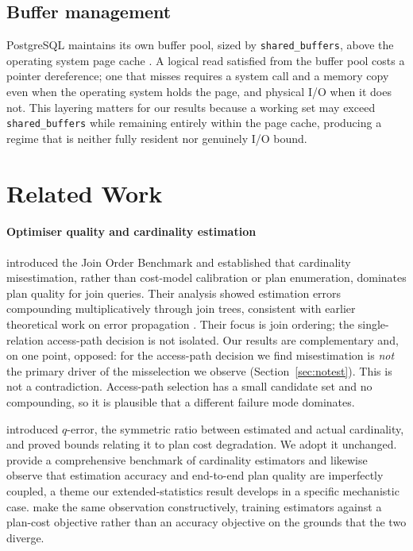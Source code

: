 \documentclass[preprint,12pt,authoryear]{elsarticle}
\newcommand{\sbuf}{\texttt{shared\_buffers}}
\begin{document}
\subsection{Buffer management}

PostgreSQL maintains its own buffer pool, sized by \sbuf{}, above the
operating system page cache \citep{effelsberg1984principles}. A logical
read satisfied from the buffer pool costs a pointer dereference; one
that misses requires a system call and a memory copy even when the
operating system holds the page, and physical I/O when it does not.
This layering matters for our results because a working set may exceed
\sbuf{} while remaining entirely within the page cache, producing a
regime that is neither fully resident nor genuinely I/O bound.

\section{Related Work}
\label{sec:related}

\paragraph{Optimiser quality and cardinality estimation}
\citet{leis2015good,leis2018query} introduced the Join Order Benchmark
and established that cardinality misestimation, rather than cost-model
calibration or plan enumeration, dominates plan quality for join
queries. Their analysis showed estimation errors compounding
multiplicatively through join trees, consistent with earlier
theoretical work on error propagation
\citep{ioannidis1991propagation}. Their focus is join ordering; the
single-relation access-path decision is not isolated. Our results are
complementary and, on one point, opposed: for the access-path decision
we find misestimation is \emph{not} the primary driver of the
misselection we observe (Section~\ref{sec:notest}). This is not a
contradiction. Access-path selection has a small candidate set and no
compounding, so it is plausible that a different failure mode dominates.

\citet{moerkotte2009preventing} introduced $q$-error, the symmetric
ratio between estimated and actual cardinality, and proved bounds
relating it to plan cost degradation. We adopt it unchanged.
\citet{han2021cardinality} provide a comprehensive benchmark of
cardinality estimators and likewise observe that estimation accuracy
and end-to-end plan quality are imperfectly coupled, a theme our
extended-statistics result develops in a specific mechanistic case.
\citet{negi2021flow} make the same observation constructively, training
estimators against a plan-cost objective rather than an accuracy
objective on the grounds that the two diverge.
\end{document}
